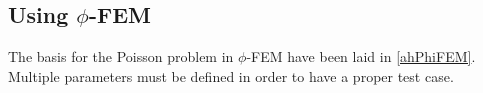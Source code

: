 \subsection{Using $\phi$-FEM}

The basis for the Poisson problem in $\phi$-FEM have been laid in \eqref{ahPhiFEM}. Multiple parameters must be defined in order to have a proper test case.

    


